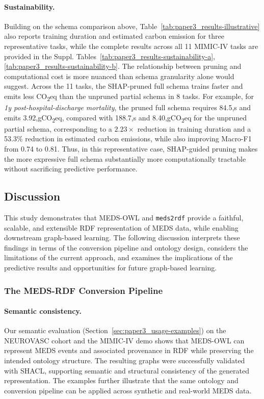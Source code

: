 \paragraph{Sustainability.}\label{sec:paper3_results-sustainability}
Building on the schema comparison above, Table~\ref{tab:paper3_results-illustrative} also reports training duration and estimated carbon emission for three representative tasks, while the complete results across all 11 MIMIC-IV tasks are provided in the Suppl. Tables~\ref{tab:paper3_results-sustainability-a}, \ref{tab:paper3_results-sustainability-b}. 
The relationship between pruning and computational cost is more nuanced than schema granularity alone would suggest. Across the 11 tasks, the SHAP-pruned full schema trains faster and emits less CO\textsubscript{2}eq than the unpruned partial schema in 8 tasks. For example, for \emph{1y post-hospital-discharge mortality}, the pruned full schema requires 84.5,s and emits 3.92,gCO\textsubscript{2}eq, compared with 188.7,s and 8.40,gCO\textsubscript{2}eq for the unpruned partial schema, corresponding to a $2.23\times$ reduction in training duration and a 53.3\% reduction in estimated carbon emissions, while also improving Macro-F1 from 0.74 to 0.81. Thus, in this representative case, SHAP-guided pruning makes the more expressive full schema substantially more computationally tractable without sacrificing predictive performance.

\subsection{Discussion}\label{sec:paper3_discussion}
This study demonstrates that MEDS-OWL and \texttt{meds2rdf} provide a faithful, scalable, and extensible RDF representation of MEDS data, while enabling downstream graph-based learning. The following discussion interprets these findings in terms of the conversion pipeline and ontology design, considers the limitations of the current approach, and examines the implications of the predictive results and opportunities for future graph-based learning.

\subsubsection{The MEDS-RDF Conversion Pipeline}
%
\paragraph{Semantic consistency.}
Our semantic evaluation (Section~\ref{sec:paper3_usage-examples}) on the NEUROVASC cohort and the MIMIC-IV demo shows that MEDS-OWL can represent MEDS events and associated provenance in RDF while preserving the intended ontology structure. The resulting graphs were successfully validated with SHACL, supporting semantic and structural consistency of the generated representation. The examples further illustrate that the same ontology and conversion pipeline can be applied across synthetic and real-world MEDS data.

